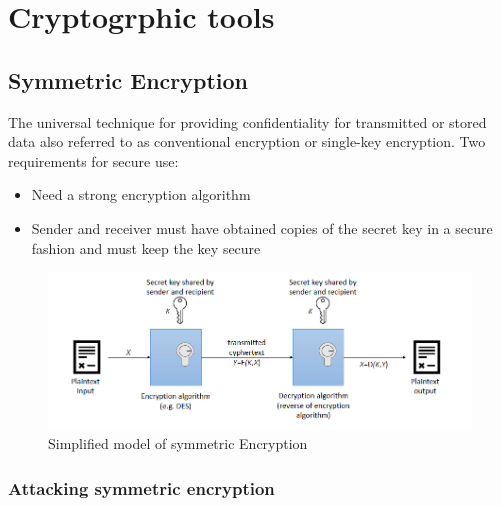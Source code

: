 \documentclass{article}
\begin{document}
\section{Cryptogrphic tools}
                    \subsection{Symmetric Encryption}
                    The universal technique for providing confidentiality for
                    transmitted or stored data also referred to as conventional encryption or single-key
                    encryption. Two requirements for secure use: 
                    \begin{itemize}
                        \item Need a strong encryption algorithm
                        \item  Sender and receiver must have obtained copies of the
                        secret key in a secure fashion and must keep the key
                        secure
                    \end{itemize}

                    \begin{figure}[h]
                        \includegraphics{../immagini/model_symmetric_security.png}
                        \caption{Simplified model of symmetric Encryption}
                    \end{figure}
                    
                        \subsubsection{Attacking symmetric encryption}
\end{document}
